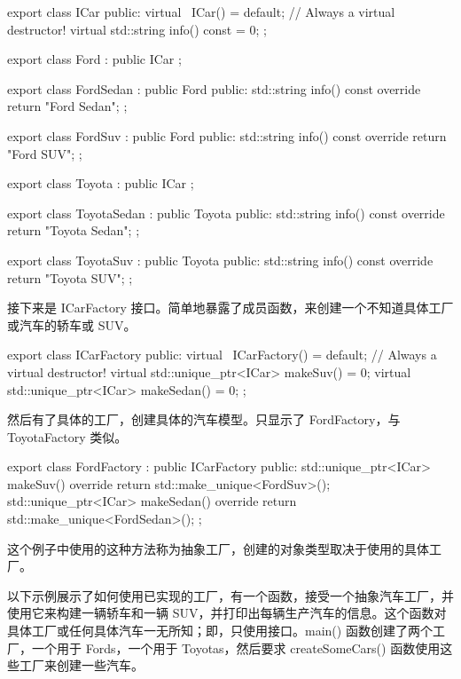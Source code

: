\begin{cpp}
export class ICar
{
    public:
    virtual ~ICar() = default; // Always a virtual destructor!
    virtual std::string info() const = 0;
};

export class Ford : public ICar { };

export class FordSedan : public Ford
{
    public:
    std::string info() const override { return "Ford Sedan"; }
};

export class FordSuv : public Ford
{
    public:
    std::string info() const override { return "Ford SUV"; }
};

export class Toyota : public ICar { };

export class ToyotaSedan : public Toyota
{
    public:
    std::string info() const override { return "Toyota Sedan"; }
};

export class ToyotaSuv : public Toyota
{
    public:
    std::string info() const override { return "Toyota SUV"; }
};
\end{cpp}

接下来是 ICarFactory 接口。简单地暴露了成员函数，来创建一个不知道具体工厂或汽车的轿车或 SUV。

\begin{cpp}
export class ICarFactory
{
    public:
        virtual ~ICarFactory() = default; // Always a virtual destructor!
        virtual std::unique_ptr<ICar> makeSuv() = 0;
        virtual std::unique_ptr<ICar> makeSedan() = 0;
};
\end{cpp}

然后有了具体的工厂，创建具体的汽车模型。只显示了 FordFactory，与ToyotaFactory 类似。

\begin{cpp}
export class FordFactory : public ICarFactory
{
    public:
        std::unique_ptr<ICar> makeSuv() override {
            return std::make_unique<FordSuv>(); }
        std::unique_ptr<ICar> makeSedan() override {
            return std::make_unique<FordSedan>(); }
};
\end{cpp}

这个例子中使用的这种方法称为抽象工厂，创建的对象类型取决于使用的具体工厂。


以下示例展示了如何使用已实现的工厂，有一个函数，接受一个抽象汽车工厂，并使用它来构建一辆轿车和一辆 SUV，并打印出每辆生产汽车的信息。这个函数对具体工厂或任何具体汽车一无所知；即，只使用接口。main() 函数创建了两个工厂，一个用于 Fords，一个用于 Toyotas，然后要求 createSomeCars() 函数使用这些工厂来创建一些汽车。

